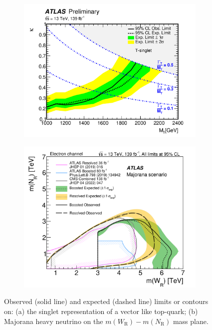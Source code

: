 \documentclass{moriond}
\begin{document}
\begin{figure}[htp]
     \centering
     \begin{subfigure}[b]{0.35\textwidth}
         \centering
         \includegraphics[width=\textwidth]{VLQ}
         \caption{}
         \label{fig:vlq}
     \end{subfigure}
     \begin{subfigure}[b]{0.32\textwidth}
         \centering
         \includegraphics[width=\textwidth]{RHN}
         \caption{}
         \label{fig:rhn}
     \end{subfigure}
     \caption{Observed (solid line) and expected (dashed line) limits or contours on: (a) the singlet representation of a vector like top-quark\protect\cite{vlq}; (b) Majorana heavy neutrino on the $m(W_{\mathrm{R}})-m(N_{\mathrm{R}})$ mass plane\protect\cite{rhn}.}
     \label{fig:limits1}
\end{figure}
\end{document}
